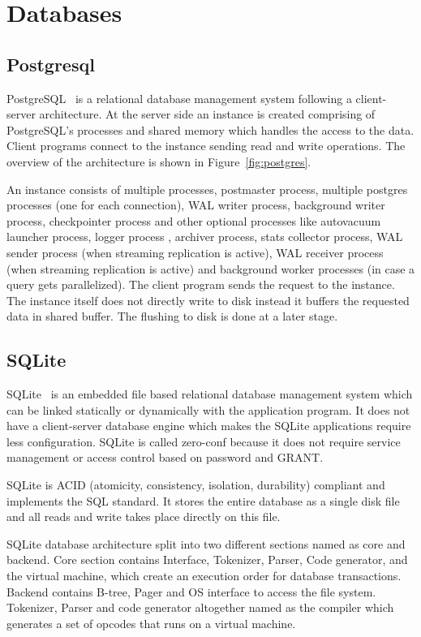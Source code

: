 \section{Databases}
\label{sec:db}

\subsection{Postgresql}

PostgreSQL~\cite{ref:pg1} is a relational database management system following a client-server architecture. At the server side an instance is created comprising of PostgreSQL's processes and shared memory which handles the access to the data. Client programs connect to the instance sending read and write operations. The overview of the architecture is shown in Figure~\ref{fig:postgres}.

An instance consists of multiple processes,  postmaster process, multiple postgres processes (one for each connection), WAL writer process, background writer process, checkpointer process and other optional processes like autovacuum launcher process, logger process , archiver process, stats collector process, WAL sender process (when streaming replication is active), WAL receiver process (when streaming replication is active) and background worker processes (in case a query gets parallelized). The client program sends the request to the instance. The instance itself does not directly write to disk instead it buffers the requested data in shared buffer. The flushing to disk is done at a later stage.

\subsection{SQLite}


SQLite~\cite{ref:sqlite2} is an embedded file based relational database management system which can be linked statically or dynamically with the application program. It does not have a client-server database engine which makes the SQLite applications require less configuration. SQLite is called zero-conf because it does not require service management or access control based on password and GRANT.


SQLite is ACID  (atomicity, consistency, isolation, durability) compliant and implements the SQL standard. It stores the entire database as a single disk file and all reads and write takes place directly on this file. 

SQLite database architecture split into two different sections named as core and backend. Core section contains Interface, Tokenizer, Parser, Code generator, and the virtual machine, which create an execution order for database transactions. Backend contains B-tree, Pager and OS interface to access the file system. Tokenizer, Parser and code generator altogether named as the compiler which generates a set of opcodes that runs on a virtual machine.
